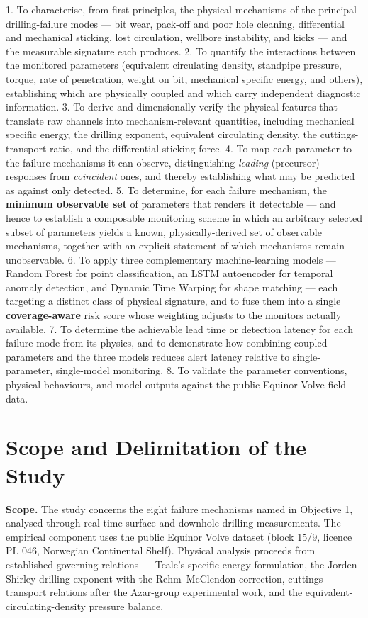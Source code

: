 \documentclass[12pt,a4paper]{report}
\begin{document}
1. To characterise, from first principles, the physical mechanisms of the principal drilling-failure modes
   --- bit wear, pack-off and poor hole cleaning, differential and mechanical sticking, lost circulation,
   wellbore instability, and kicks --- and the measurable signature each produces.
2. To quantify the interactions between the monitored parameters (equivalent circulating density,
   standpipe pressure, torque, rate of penetration, weight on bit, mechanical specific energy, and
   others), establishing which are physically coupled and which carry independent diagnostic information.
3. To derive and dimensionally verify the physical features that translate raw channels into
   mechanism-relevant quantities, including mechanical specific energy, the drilling exponent, equivalent
   circulating density, the cuttings-transport ratio, and the differential-sticking force.
4. To map each parameter to the failure mechanisms it can observe, distinguishing \emph{leading} (precursor)
   responses from \emph{coincident} ones, and thereby establishing what may be predicted as against only
   detected.
5. To determine, for each failure mechanism, the \textbf{minimum observable set} of parameters that renders it
   detectable --- and hence to establish a composable monitoring scheme in which an arbitrary selected
   subset of parameters yields a known, physically-derived set of observable mechanisms, together with an
   explicit statement of which mechanisms remain unobservable.
6. To apply three complementary machine-learning models --- Random Forest for point classification, an LSTM
   autoencoder for temporal anomaly detection, and Dynamic Time Warping for shape matching --- each
   targeting a distinct class of physical signature, and to fuse them into a single \textbf{coverage-aware} risk
   score whose weighting adjusts to the monitors actually available.
7. To determine the achievable lead time or detection latency for each failure mode from its physics, and
   to demonstrate how combining coupled parameters and the three models reduces alert latency relative to
   single-parameter, single-model monitoring.
8. To validate the parameter conventions, physical behaviours, and model outputs against the public
   Equinor Volve field data.

\section{Scope and Delimitation of the Study}

\textbf{Scope.} The study concerns the eight failure mechanisms named in Objective 1, analysed through
real-time surface and downhole drilling measurements. The empirical component uses the public Equinor
Volve dataset (block 15/9, licence PL 046, Norwegian Continental Shelf). Physical analysis proceeds from
established governing relations --- Teale's specific-energy formulation, the Jorden--Shirley drilling
exponent with the Rehm--McClendon correction, cuttings-transport relations after the Azar-group
experimental work, and the equivalent-circulating-density pressure balance.
\end{document}

